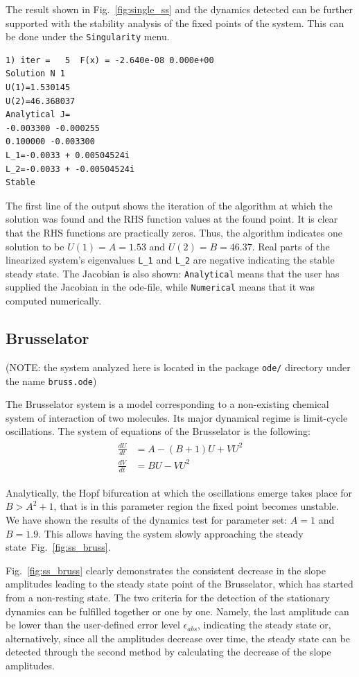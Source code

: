 \documentclass[11pt,a4paper]{article}
\begin{document}
The result shown in Fig.~\ref{fig:single_ss} and the dynamics detected can be further
supported with the stability analysis of the fixed points of the system. This can be
done under the \texttt{Singularity} menu.
\begin{verbatim}
1) iter =   5  F(x) = -2.640e-08 0.000e+00 
Solution N 1
U(1)=1.530145
U(2)=46.368037
Analytical J=
-0.003300 -0.000255 
0.100000 -0.003300 
L_1=-0.0033 + 0.00504524i
L_2=-0.0033 + -0.00504524i
Stable
\end{verbatim}

The first line of the output shows the iteration of the algorithm at which the
solution was found and the RHS function values at the found point. It is clear that
the RHS functions are practically zeros. Thus, the algorithm indicates one solution
to be $U(1)=A=1.53$ and $U(2)=B=46.37$. Real parts of the linearized system's
eigenvalues \texttt{L\_1} and \texttt{L\_2} are negative indicating the stable steady
state. The Jacobian is also shown: \texttt{Analytical} means that the user has
supplied the Jacobian in the ode-file, while \texttt{Numerical} means that it was
computed numerically.

\subsection{Brusselator}
\label{sec:brusselator}

(NOTE: the system analyzed here is located in the package \texttt{ode/} directory
under the name \texttt{bruss.ode})

The Brusselator system is a model corresponding to a non-existing chemical system of
interaction of two molecules. Its major dynamical regime is limit-cycle oscillations.
The system of equations of the Brusselator is the following:
\begin{align}
  \label{eq:2}
  \begin{split}
    \frac{dU}{dt}&=A-(B+1)U+VU^2\\
    \frac{dV}{dt}&=BU-VU^2
  \end{split}
\end{align}

Analytically, the Hopf bifurcation at which the oscillations emerge takes place for
$B>A^2+1$, that is in this parameter region the fixed point becomes unstable. We have
shown the results of the dynamics test for parameter set: $A=1$ and $B=1.9$. This
allows having the system slowly approaching the steady
state~Fig.~\ref{fig:ss_bruss}.

Fig.~\ref{fig:ss_bruss} clearly demonstrates the consistent decrease in the slope
amplitudes leading to the steady state point of the Brusselator, which has started
from a non-resting state. The two criteria for the detection of the stationary
dynamics can be fulfilled together or one by one. Namely, the last amplitude can be
lower than the user-defined error level $\epsilon_{abs}$, indicating the steady state
or, alternatively, since all the amplitudes decrease over time, the steady state can
be detected through the second method by calculating the decrease of the slope
amplitudes.
\end{document}
